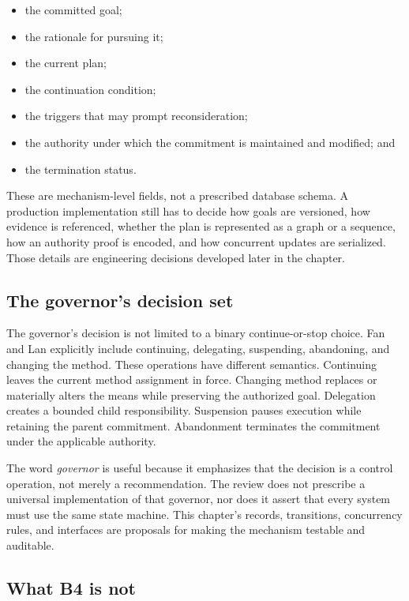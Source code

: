 \begin{itemize}
  \item the committed goal;
  \item the rationale for pursuing it;
  \item the current plan;
  \item the continuation condition;
  \item the triggers that may prompt reconsideration;
  \item the authority under which the commitment is maintained and modified; and
  \item the termination status.
\end{itemize}

These are mechanism-level fields, not a prescribed database schema. A production implementation still has to decide how goals are versioned, how evidence is referenced, whether the plan is represented as a graph or a sequence, how an authority proof is encoded, and how concurrent updates are serialized. Those details are engineering decisions developed later in the chapter.

\subsection{The governor's decision set}

The governor's decision is not limited to a binary continue-or-stop choice. Fan and Lan explicitly include continuing, delegating, suspending, abandoning, and changing the method. These operations have different semantics. Continuing leaves the current method assignment in force. Changing method replaces or materially alters the means while preserving the authorized goal. Delegation creates a bounded child responsibility. Suspension pauses execution while retaining the parent commitment. Abandonment terminates the commitment under the applicable authority.

The word \emph{governor} is useful because it emphasizes that the decision is a control operation, not merely a recommendation. The review does not prescribe a universal implementation of that governor, nor does it assert that every system must use the same state machine. This chapter's records, transitions, concurrency rules, and interfaces are proposals for making the mechanism testable and auditable.

\subsection{What B4 is not}

